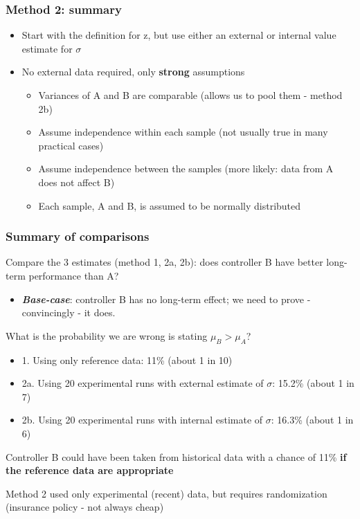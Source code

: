 \begin{frame}\frametitle{Method 2: summary}
	\begin{itemize}
		\item Start with the definition for z, but use either an external or internal value estimate for $\sigma$
		\item No external data required, only \textbf{strong} assumptions
		\begin{itemize}
			\item Variances of A and B are comparable (allows us to pool them - method 2b)
			\item Assume independence within each sample (not usually true in many practical cases)
			\item Assume independence between the samples (more likely: data from A does not affect B)
			\item Each sample, A and B, is assumed to be normally distributed
		\end{itemize}
	\end{itemize}
\end{frame}

\begin{frame}\frametitle{Summary of comparisons}

	Compare the 3 estimates (method 1, 2a, 2b): does controller B have better long-term performance than A?
	\begin{itemize}
		\item \textbf{\emph{Base-case}}: controller B has no long-term effect; we need to prove - convincingly - it does.
	\end{itemize}

	What is the probability we are wrong is stating $\mu_B > \mu_A$?
	\begin{itemize}
		\item 1. Using only reference data: 11\% (about 1 in 10)
		\item 2a. Using 20 experimental runs with external estimate of $\sigma$: 15.2\% (about 1 in 7)
		\item 2b. Using 20 experimental runs with internal estimate of $\sigma$: 16.3\% (about 1 in 6)
	\end{itemize}

	Controller B could have been taken from historical data with a chance of 11\% \textbf{if the reference data are appropriate}

	Method 2 used only experimental (recent) data, but requires randomization (insurance policy - not always cheap)
\end{frame}

